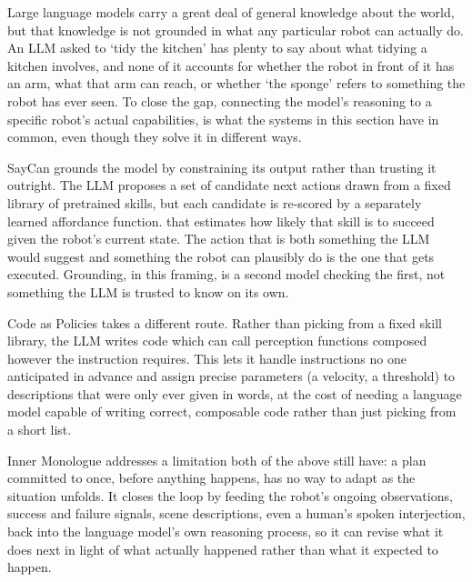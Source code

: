 \label{chap:literature}


\label{sec:llm_planners}

Large language models carry a great deal of general knowledge about the world, but that
knowledge is not grounded in what any particular robot can actually do. An LLM asked to
`tidy the kitchen' has plenty to say about what tidying a kitchen involves, and none of it
accounts for whether the robot in front of it has an arm, what that arm can reach, or whether
`the sponge' refers to something the robot has ever seen. To close the gap, connecting the
model's reasoning to a specific robot's actual capabilities, is what the systems in this
section have in common, even though they solve it in different ways.

SayCan \cite{ahn2022saycan} grounds the model by constraining its output rather than trusting
it outright. The LLM proposes a set of candidate next actions drawn from a fixed library of
pretrained skills, but each candidate is re-scored by a separately learned affordance function.
that estimates how likely that skill is to succeed given the robot's current state. The action
that is both something the LLM would suggest and something the robot can plausibly do is the
one that gets executed. Grounding, in this framing, is a second model checking the first, not
something the LLM is trusted to know on its own.



Code as Policies \cite{liang2023codeaspolicies} takes a different route. Rather than picking
from a fixed skill library, the LLM writes code which can call perception functions composed however the
instruction requires. This lets it handle instructions no one anticipated in advance and
assign precise parameters (a velocity, a threshold) to descriptions that were only ever given
in words, at the cost of needing a language model capable of writing correct, composable code
rather than just picking from a short list.

Inner Monologue \cite{huang2023innermonologue} addresses a limitation both of the above still
have: a plan committed to once, before anything happens, has no way to adapt as the situation
unfolds. It closes the loop by feeding the robot's ongoing observations, success and failure
signals, scene descriptions, even a human's spoken interjection, back into the language
model's own reasoning process, so it can revise what it does next in light of what actually
happened rather than what it expected to happen.


